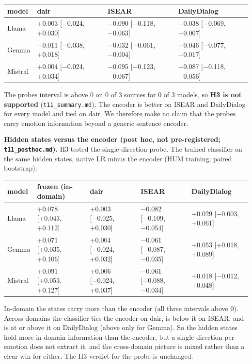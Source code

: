 \documentclass[
  10pt,
]{article}
\newcounter{none} %
\begin{document}
{\def\LTcaptype{none} %
\begin{longtable}[]{@{}llll@{}}
\toprule\noalign{}
model & dair & ISEAR & DailyDialog \\
\midrule\noalign{}
\endhead
\bottomrule\noalign{}
\endlastfoot
Llama & +0.003 {[}−0.024, +0.030{]} & −0.090 {[}−0.118, −0.063{]} &
−0.038 {[}−0.069, −0.007{]} \\
Gemma & −0.011 {[}−0.038, +0.018{]} & −0.032 {[}−0.061, −0.004{]} &
−0.046 {[}−0.077, −0.017{]} \\
Mistral & +0.004 {[}−0.024, +0.034{]} & −0.095 {[}−0.123, −0.067{]} &
−0.087 {[}−0.118, −0.056{]} \\
\end{longtable}
}

The probe\textquotesingle s interval is above 0 on 0 of 3 sources for 0
of 3 models, so \textbf{H3 is not supported} (\texttt{t11\_summary.md}).
The encoder is better on ISEAR and DailyDialog for every model and tied
on dair. We therefore make no claim that the probes carry emotion
information beyond a generic sentence encoder.

\textbf{Hidden states versus the encoder (post hoc, not pre-registered;
\texttt{t11\_posthoc.md}).} H3 tested the single-direction probe. The
trained classifier on the same hidden states, native LR minus the
encoder (HUM training; paired bootstrap):

{\def\LTcaptype{none} %
\begin{longtable}[]{@{}lllll@{}}
\toprule\noalign{}
model & frozen (in-domain) & dair & ISEAR & DailyDialog \\
\midrule\noalign{}
\endhead
\bottomrule\noalign{}
\endlastfoot
Llama & +0.078 {[}+0.043, +0.112{]} & +0.003 {[}−0.025, +0.030{]} &
−0.082 {[}−0.109, −0.054{]} & +0.029 {[}−0.003, +0.061{]} \\
Gemma & +0.071 {[}+0.035, +0.106{]} & +0.004 {[}−0.024, +0.032{]} &
−0.061 {[}−0.087, −0.035{]} & +0.053 {[}+0.018, +0.089{]} \\
Mistral & +0.091 {[}+0.053, +0.127{]} & +0.006 {[}−0.024, +0.037{]} &
−0.061 {[}−0.088, −0.034{]} & +0.018 {[}−0.012, +0.048{]} \\
\end{longtable}
}

In-domain the states carry more than the encoder (all three intervals
above 0). Across domains the classifier ties the encoder on dair, is
below it on ISEAR, and is at or above it on DailyDialog (above only for
Gemma). So the hidden states hold more in-domain information than the
encoder, but a single direction per emotion does not extract it, and the
cross-domain picture is mixed rather than a clear win for either. The H3
verdict for the probe is unchanged.
\end{document}
